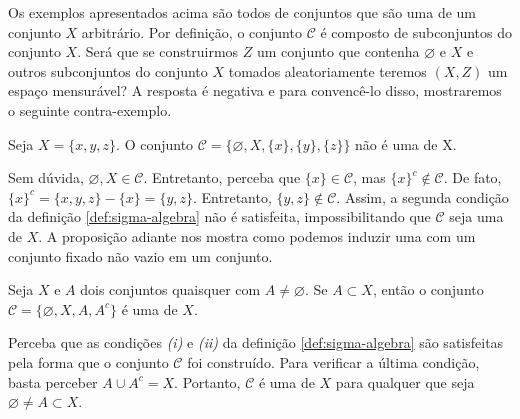 
Os exemplos apresentados acima são todos de conjuntos que são uma \sigal de um conjunto $X$ arbitrário.
Por definição, o conjunto $\mathcal{C}$ é composto de subconjuntos do conjunto $X$. 
Será que se construirmos $Z$ um conjunto que contenha $\varnothing$ e $X$ e outros subconjuntos do conjunto $X$ tomados aleatoriamente teremos $(X,Z)$ um espaço mensurável? A resposta é negativa e para convencê-lo disso, mostraremos o seguinte contra-exemplo.

\begin{counterexample}
    Seja $X = \{x,y,z\}$. O conjunto $\mathcal{C} = \{\varnothing, X, \{x\}, \{y\}, \{z\}\}$ não é uma \sigal de X.
\end{counterexample}

Sem dúvida, $\varnothing, X \in \mathcal{C}$. 
Entretanto, perceba que $\{x\} \in \mathcal{C}$, mas $\{x\}^c \notin \mathcal{C}$.
De fato, 
$
\{x\}^c
=\{x,y,z\} 
-\{x\} 
= \{y,z\}.
$
Entretanto, $\{y,z\} \notin \mathcal{C}$.
Assim, a segunda condição da definição \ref{def:sigma-algebra} não é satisfeita, impossibilitando que $\mathcal{C}$ seja uma \sigal de $X$.
A proposição adiante nos mostra como podemos induzir uma \sigal com um conjunto fixado não vazio em um conjunto.


\begin{proposition}
\label{prop:sigma-complementar}
    Seja $X$ e $A$ dois conjuntos quaisquer com $A \neq \varnothing$.
    Se $A \subset X$, então o conjunto 
    $\mathcal{C}=\{\varnothing, X, A, A^c\}$ é uma \sigal de $X$.
\end{proposition}

\begin{prova}
    Perceba que as condições \textit{(i)} e \textit{(ii)} da definição \ref{def:sigma-algebra} são satisfeitas pela forma que o conjunto  $\mathcal{C}$ foi construído. Para verificar a última condição, basta perceber $A \cup A^c = X$. Portanto, $\mathcal{C}$ é uma \sigal de $X$ para qualquer que seja $ \varnothing \neq A \subset X$.
\end{prova}

